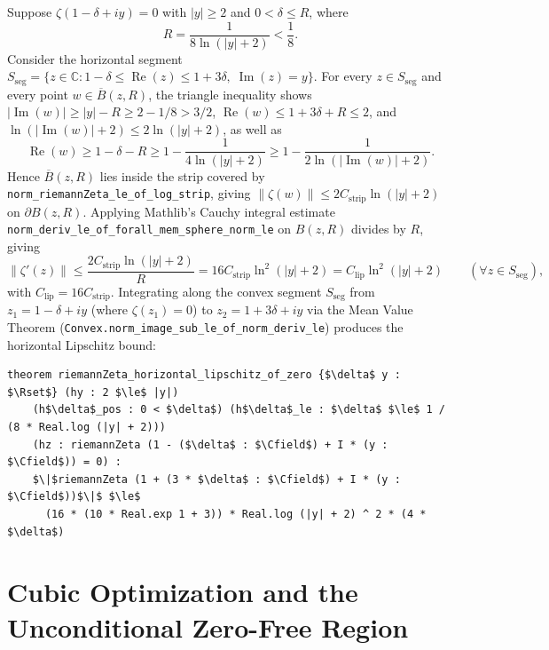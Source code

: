 \documentclass[11pt,a4paper]{article}
\theoremstyle{definition}
\newcommand{\Rset}{\mathbb{R}}
\newcommand{\Cfield}{\mathbb{C}}
\begin{document}
Suppose $\zeta(1 - \delta + iy) = 0$ with $|y| \ge 2$ and $0 < \delta \le R$, where
\begin{equation}
R = \frac{1}{8\ln(|y|+2)} < \frac{1}{8}.
\end{equation}
Consider the horizontal segment $S_{\text{seg}} = \{z \in \Cfield : 1 - \delta \le \operatorname{Re}(z) \le 1 + 3\delta,\; \operatorname{Im}(z) = y\}$. For every $z \in S_{\text{seg}}$ and every point $w \in \overline{B}(z, R)$, the triangle inequality shows $|{\operatorname{Im}}(w)| \ge |y| - R \ge 2 - 1/8 > 3/2$, $\operatorname{Re}(w) \le 1 + 3\delta + R \le 2$, and $\ln(|{\operatorname{Im}}(w)|+2) \le 2\ln(|y|+2)$, as well as
\begin{equation}
\operatorname{Re}(w) \ge 1 - \delta - R \ge 1 - \frac{1}{4\ln(|y|+2)} \ge 1 - \frac{1}{2\ln(|{\operatorname{Im}}(w)|+2)}.
\end{equation}
Hence $\overline{B}(z, R)$ lies inside the strip covered by \texttt{norm\_\allowbreak riemannZeta\_\allowbreak le\_of\_log\_strip}, giving $\|\zeta(w)\| \le 2 C_{\text{strip}} \ln(|y|+2)$ on $\partial B(z, R)$. Applying Mathlib's Cauchy integral estimate \texttt{norm\_deriv\_\allowbreak le\_of\_forall\_\allowbreak mem\_sphere\_\allowbreak norm\_le} on $B(z, R)$ divides by $R$, giving
\begin{equation}
\|\zeta'(z)\| \le \frac{2 C_{\text{strip}} \ln(|y|+2)}{R} = 16 C_{\text{strip}} \ln^2(|y|+2) = C_{\text{lip}} \ln^2(|y|+2) \qquad (\forall z \in S_{\text{seg}}),
\end{equation}
with $C_{\text{lip}} = 16 C_{\text{strip}}$. Integrating along the convex segment $S_{\text{seg}}$ from $z_1 = 1 - \delta + iy$ (where $\zeta(z_1) = 0$) to $z_2 = 1 + 3\delta + iy$ via the Mean Value Theorem (\texttt{Convex.\allowbreak norm\_\allowbreak image\_sub\_\allowbreak le\_of\_norm\_\allowbreak deriv\_le}) produces the horizontal Lipschitz bound:
\begin{lstlisting}
theorem riemannZeta_horizontal_lipschitz_of_zero {$\delta$ y : $\Rset$} (hy : 2 $\le$ |y|)
    (h$\delta$_pos : 0 < $\delta$) (h$\delta$_le : $\delta$ $\le$ 1 / (8 * Real.log (|y| + 2)))
    (hz : riemannZeta (1 - ($\delta$ : $\Cfield$) + I * (y : $\Cfield$)) = 0) :
    $\|$riemannZeta (1 + (3 * $\delta$ : $\Cfield$) + I * (y : $\Cfield$))$\|$ $\le$
      (16 * (10 * Real.exp 1 + 3)) * Real.log (|y| + 2) ^ 2 * (4 * $\delta$)
\end{lstlisting}

\section{Cubic Optimization and the Unconditional Zero-Free Region}\label{sec:repulsion}
\end{document}
